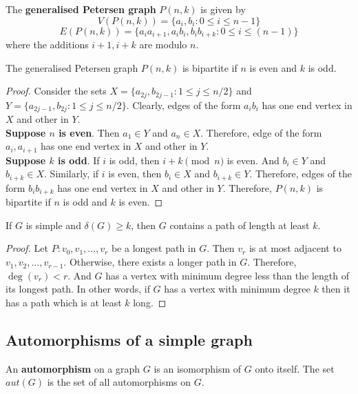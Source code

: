 \begin{definition}
	The \textbf{generalised Petersen graph} $P(n,k)$ is given by
	$$ V(P(n,k)) = \{ a_i,b_i : 0 \le i \le n-1 \} $$
	$$ E(P(n,k)) = \{ a_ia_{i+1}, a_ib_i, b_ib_{i+k} : 0 \le i \le (n-1) \}$$
	where the additions $i+1, i+k$ are modulo $n$.
\end{definition}
\begin{exercise}
	The generalised Petersen graph $P(n,k)$ is bipartite if $n$ is even and $k$ is odd.
\end{exercise}
\begin{proof}
	Consider the sets $X = \{ a_{2j}, b_{2j-1} : 1 \le j \le n/2 \}$ and $Y = \{ a_{2j-1}, b_{2j} : 1 \le j \le n/2 \}$. Clearly, edges of the form $a_ib_i$ has one end vertex in $X$ and other in $Y$.\\

	\textbf{Suppose $n$ is even}. Then $a_1 \in Y$ and $a_n \in X$. Therefore, edge of the form $a_i,a_{i+1}$ has one end vertex in $X$ and other in $Y$.\\

	\textbf{Suppose $k$ is odd}. If $i$ is odd, then $i+k \pmod{n}$ is even. And $b_i \in Y$ and $b_{i+k} \in X$. Similarly, if $i$ is even, then $b_i \in X$ and $b_{i+k} \in Y$. Therefore, edges of the form $b_ib_{i+k}$ has one end vertex in $X$ and other in $Y$.
	Therefore, $P(n,k)$ is bipartite if $n$ is odd and $k$ is even.
\end{proof}

\begin{exercise}
	If $G$ is simple and $\delta(G) \ge k$, then $G$ contains a path of length at least $k$.
\end{exercise}
\begin{proof}
	Let $P : v_0,v_1,\dots,v_r$ be a longest path in $G$.
	Then $v_r$ is at most adjacent to $v_1,v_2,\dots,v_{r-1}$. Otherwise, there exists a longer path in $G$.
	Therefore, $\deg(v_r) < r$. And $G$ has a vertex with minimum degree less than the length of its longest path.
	In other words, if $G$ has a vertex with minimum degree $k$ then it has a path which is at least $k$ long.
\end{proof}

\subsection{Automorphisms of a simple graph}
\begin{definition}
	An \textbf{automorphism} on a graph $G$ is an isomorphism of $G$ onto itself.
	The set $aut(G)$ is the set of all automorphisms on $G$.
\end{definition}

